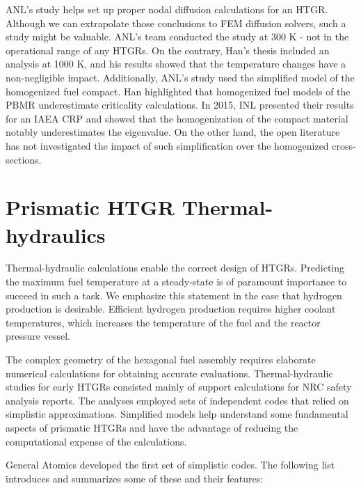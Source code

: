 ANL's study helps set up proper nodal diffusion calculations for an \gls{HTGR}.
Although we can extrapolate those conclusions to \gls{FEM} diffusion solvers, such a study might be valuable.
ANL's team conducted the study at 300 K - not in the operational range of any \glspl{HTGR}.
On the contrary, Han's thesis included an analysis at 1000 K, and his results showed that the temperature changes have a non-negligible impact.
Additionally, ANL's study used the simplified model of the homogenized fuel compact.
Han highlighted that homogenized fuel models of the \gls{PBMR} underestimate criticality calculations.
In 2015, \gls{INL} presented their results \cite{strydom_results_2015} for an \gls{IAEA} \gls{CRP} \cite{tyobeka_htgr_2011} and showed that the homogenization of the compact material notably underestimates the eigenvalue.
On the other hand, the open literature has not investigated the impact of such simplification over the homogenized cross-sections.

\section{Prismatic HTGR Thermal-hydraulics}

Thermal-hydraulic calculations enable the correct design of \glspl{HTGR}.
Predicting the maximum fuel temperature at a steady-state is of paramount importance to succeed in such a task.
We emphasize this statement in the case that hydrogen production is desirable.
Efficient hydrogen production requires higher coolant temperatures, which increases the temperature of the fuel and the reactor pressure vessel.

The complex geometry of the hexagonal fuel assembly requires elaborate numerical calculations for obtaining accurate evaluations.
Thermal-hydraulic studies for early \glspl{HTGR} consisted mainly of support calculations for \gls{NRC} safety analysis reports.
The analyses employed sets of independent codes that relied on simplistic approximations.
Simplified models help understand some fundamental aspects of prismatic \glspl{HTGR} and have the advantage of reducing the computational expense of the calculations.

General Atomics \cite{shenoy_htgr_1974} developed the first set of simplistic codes.
The following list introduces and summarizes some of these and their features:


